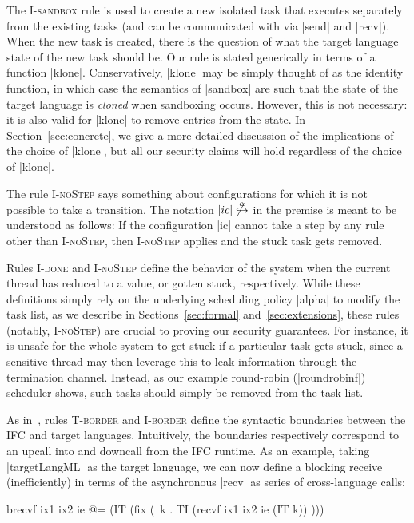 The \textsc{I-sandbox} rule is used to create a new isolated task that
executes separately from the existing tasks (and can be communicated
with via |send| and |recv|).  When the new task is created, there
is the question of what the target language state of the new task should
be.  Our rule is stated generically in terms of a function |klone|.
Conservatively, |klone| may be simply thought of as the identity
function, in which
case the semantics of |sandbox| are such that the state of the target language is \emph{cloned}
when sandboxing occurs.  However, this is not necessary: it is also valid for |klone|
to remove entries from the state.  In Section~\ref{sec:concrete}, we give a more detailed
discussion of the implications of the choice of |klone|, but all our
security claims will hold regardless of the choice of |klone|.

The rule \textsc{I-noStep} says something about configurations for which
it is not possible to take a transition.  The notation
$|ic|\not\overset{\alpha}{\hookrightarrow}$ in the premise
is meant to be understood as
follows:  If the configuration |ic| cannot take a step by any rule other
than \textsc{I-noStep}, then \textsc{I-noStep} applies and the
stuck task gets removed.

Rules \textsc{I-done} and \textsc{I-noStep} define the behavior of the system
when the current thread has reduced to a value, or gotten stuck, respectively.
%
While these definitions simply rely on the underlying scheduling policy
|alpha| to modify the task list, as we describe in Sections~\ref{sec:formal}
and~\ref{sec:extensions}, these rules (notably, \textsc{I-noStep}) are crucial
to proving our security guarantees.
%
For instance, it is unsafe for the whole system to get stuck if a particular
task gets stuck, since a sensitive thread may then leverage this to leak
information through the termination channel.
%
Instead, as our example round-robin (|roundrobinf|) scheduler shows,
such tasks should simply be removed from the task list.

%
As in~\cite{Matthews:2007:OSM:1190216.1190220}, rules \textsc{T-border} and
\textsc{I-border} define the syntactic boundaries between the IFC and target
languages.
%
Intuitively, the boundaries respectively correspond to an upcall into and
downcall from the IFC runtime.
%
As an example, taking |targetLangML| as the target language, we can now define a
blocking receive (inefficiently) in terms of the asynchronous |recv| as series
of cross-language calls:
\begin{code}
brecvf ix1 ix2 ie @= (IT (fix (\ k . TI (recvf ix1 ix2 ie (IT k)) )))
\end{code}



